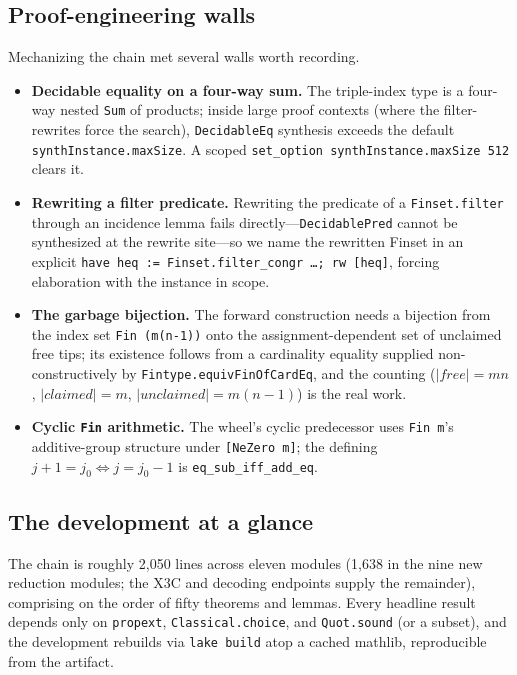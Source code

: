 \documentclass[sigplan,review,anonymous]{acmart}
\begin{document}
\subsection{Proof-engineering walls}\label{sec:walls}

Mechanizing the chain met several walls worth recording.
\begin{itemize}
  \item \textbf{Decidable equality on a four-way sum.} The triple-index type is a four-way nested
    \lstinline{Sum} of products; inside large proof contexts (where the filter-rewrites force the search),
    \lstinline{DecidableEq} synthesis exceeds the default \lstinline{synthInstance.maxSize}. A scoped
    \lstinline{set_option synthInstance.maxSize 512} clears it.
  \item \textbf{Rewriting a filter predicate.} Rewriting the predicate of a \lstinline{Finset.filter} through
    an incidence lemma fails directly---\lstinline{DecidablePred} cannot be synthesized at the rewrite
    site---so we name the rewritten Finset in an explicit
    \lstinline{have heq := Finset.filter_congr …; rw [heq]}, forcing elaboration with the instance in scope.
  \item \textbf{The garbage bijection.} The forward construction needs a bijection from the index set
    \lstinline{Fin (m(n-1))} onto the assignment-dependent set of unclaimed free tips; its existence follows
    from a cardinality equality supplied non-constructively by \lstinline{Fintype.equivFinOfCardEq}, and the
    counting ($|\mathit{free}| = mn$, $|\mathit{claimed}| = m$, $|\mathit{unclaimed}| = m(n{-}1)$) is the real
    work.
  \item \textbf{Cyclic \lstinline{Fin} arithmetic.} The wheel's cyclic predecessor uses \lstinline{Fin m}'s
    additive-group structure under \lstinline{[NeZero m]}; the defining $j{+}1 = j_0 \iff j = j_0{-}1$ is
    \lstinline{eq_sub_iff_add_eq}.
\end{itemize}

\subsection{The development at a glance}\label{sec:metrics}

The chain is roughly 2,050 lines across eleven modules (1,638 in the nine new reduction modules; the X3C and
decoding endpoints supply the remainder), comprising on the order of fifty theorems and lemmas. Every headline
result depends only on \lstinline{propext}, \lstinline{Classical.choice}, and \lstinline{Quot.sound} (or a
subset), and the development rebuilds via \lstinline{lake build} atop a cached mathlib, reproducible from the
artifact.
\end{document}
